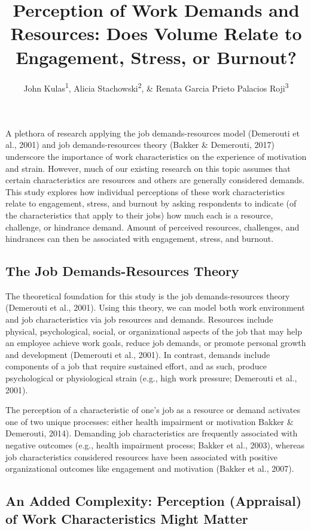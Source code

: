 \documentclass[
  man]{apa6}
\title{Perception of Work Demands and Resources: Does Volume Relate to Engagement, Stress, or Burnout?}
\author{John Kulas\textsuperscript{1}, Alicia Stachowski\textsuperscript{2}, \& Renata Garcia Prieto Palacios Roji\textsuperscript{3}}
\date{}
\affiliation{\vspace{0.5cm}\textsuperscript{1} eRg\\\textsuperscript{2} University of Wisconsin - Stout\\\textsuperscript{3} PepsiCo}
\begin{document}
\maketitle

A plethora of research applying the job demands-resources model (Demerouti et al., 2001) and job demands-resources theory (Bakker \& Demerouti, 2017) underscore the importance of work characteristics on the experience of motivation and strain. However, much of our existing research on this topic assumes that certain characteristics are resources and others are generally considered demands. This study explores how individual perceptions of these work characteristics relate to engagement, stress, and burnout by asking respondents to indicate (of the characteristics that apply to their jobs) how much each is a resource, challenge, or hindrance demand. Amount of perceived resources, challenges, and hindrances can then be associated with engagement, stress, and burnout.

\hypertarget{the-job-demands-resources-theory}{%
\subsection{The Job Demands-Resources Theory}\label{the-job-demands-resources-theory}}

The theoretical foundation for this study is the job demands-resources theory (Demerouti et al., 2001). Using this theory, we can model both work environment and job characteristics via job resources and demands. Resources include physical, psychological, social, or organizational aspects of the job that may help an employee achieve work goals, reduce job demands, or promote personal growth and development (Demerouti et al., 2001). In contrast, demands include components of a job that require sustained effort, and as such, produce psychological or physiological strain (e.g., high work pressure; Demerouti et al., 2001).

The perception of a characteristic of one's job as a resource or demand activates one of two unique processes: either health impairment or motivation Bakker \& Demerouti, 2014). Demanding job characteristics are frequently associated with negative outcomes (e.g., health impairment process; Bakker et al., 2003), whereas job characteristics considered resources have been associated with positive organizational outcomes like engagement and motivation (Bakker et al., 2007).

\hypertarget{an-added-complexity-perception-appraisal-of-work-characteristics-might-matter}{%
\subsection{An Added Complexity: Perception (Appraisal) of Work Characteristics Might Matter}\label{an-added-complexity-perception-appraisal-of-work-characteristics-might-matter}}
\end{document}
